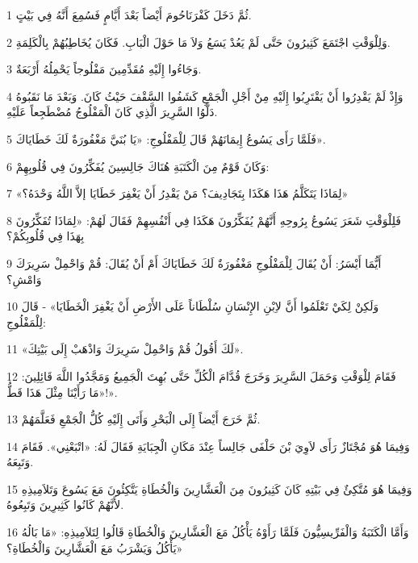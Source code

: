 \par 1 ثُمَّ دَخَلَ كَفْرَنَاحُومَ أَيْضاً بَعْدَ أَيَّامٍ فَسُمِعَ أَنَّهُ فِي بَيْتٍ.
\par 2 وَلِلْوَقْتِ اجْتَمَعَ كَثِيرُونَ حَتَّى لَمْ يَعُدْ يَسَعُ وَلاَ مَا حَوْلَ الْبَابِ. فَكَانَ يُخَاطِبُهُمْ بِالْكَلِمَةِ.
\par 3 وَجَاءُوا إِلَيْهِ مُقَدِّمِينَ مَفْلُوجاً يَحْمِلُهُ أَرْبَعَةٌ.
\par 4 وَإِذْ لَمْ يَقْدِرُوا أَنْ يَقْتَرِبُوا إِلَيْهِ مِنْ أَجْلِ الْجَمْعِ كَشَفُوا السَّقْفَ حَيْثُ كَانَ. وَبَعْدَ مَا نَقَبُوهُ دَلَّوُا السَّرِيرَ الَّذِي كَانَ الْمَفْلُوجُ مُضْطَجِعاً عَلَيْهِ.
\par 5 فَلَمَّا رَأَى يَسُوعُ إِيمَانَهُمْ قَالَ لِلْمَفْلُوجِ: «يَا بُنَيَّ مَغْفُورَةٌ لَكَ خَطَايَاكَ».
\par 6 وَكَانَ قَوْمٌ مِنَ الْكَتَبَةِ هُنَاكَ جَالِسِينَ يُفَكِّرُونَ فِي قُلُوبِهِمْ:
\par 7 «لِمَاذَا يَتَكَلَّمُ هَذَا هَكَذَا بِتَجَادِيفَ؟ مَنْ يَقْدِرُ أَنْ يَغْفِرَ خَطَايَا إلاَّ اللَّهُ وَحْدَهُ؟»
\par 8 فَلِلْوَقْتِ شَعَرَ يَسُوعُ بِرُوحِهِ أَنَّهُمْ يُفَكِّرُونَ هَكَذَا فِي أَنْفُسِهِمْ فَقَالَ لَهُمْ: «لِمَاذَا تُفَكِّرُونَ بِهَذَا فِي قُلُوبِكُمْ؟
\par 9 أَيُّمَا أَيْسَرُ: أَنْ يُقَالَ لِلْمَفْلُوجِ مَغْفُورَةٌ لَكَ خَطَايَاكَ أَمْ أَنْ يُقَالَ: قُمْ وَاحْمِلْ سَرِيرَكَ وَامْشِ؟
\par 10 وَلَكِنْ لِكَيْ تَعْلَمُوا أَنَّ لاِبْنِ الإِنْسَانِ سُلْطَاناً عَلَى الأَرْضِ أَنْ يَغْفِرَ الْخَطَايَا» - قَالَ لِلْمَفْلُوجِ:
\par 11 «لَكَ أَقُولُ قُمْ وَاحْمِلْ سَرِيرَكَ وَاذْهَبْ إِلَى بَيْتِكَ».
\par 12 فَقَامَ لِلْوَقْتِ وَحَمَلَ السَّرِيرَ وَخَرَجَ قُدَّامَ الْكُلِّ حَتَّى بُهِتَ الْجَمِيعُ وَمَجَّدُوا اللَّهَ قَائِلِينَ: «مَا رَأَيْنَا مِثْلَ هَذَا قَطُّ!».
\par 13 ثُمَّ خَرَجَ أَيْضاً إِلَى الْبَحْرِ وَأَتَى إِلَيْهِ كُلُّ الْجَمْعِ فَعَلَّمَهُمْ.
\par 14 وَفِيمَا هُوَ مُجْتَازٌ رَأَى لاَوِيَ بْنَ حَلْفَى جَالِساً عِنْدَ مَكَانِ الْجِبَايَةِ فَقَالَ لَهُ: «اتْبَعْنِي». فَقَامَ وَتَبِعَهُ.
\par 15 وَفِيمَا هُوَ مُتَّكِئٌ فِي بَيْتِهِ كَانَ كَثِيرُونَ مِنَ الْعَشَّارِينَ وَالْخُطَاةِ يَتَّكِئُونَ مَعَ يَسُوعَ وَتَلاَمِيذِهِ لأَنَّهُمْ كَانُوا كَثِيرِينَ وَتَبِعُوهُ.
\par 16 وَأَمَّا الْكَتَبَةُ وَالْفَرِّيسِيُّونَ فَلَمَّا رَأَوْهُ يَأْكُلُ مَعَ الْعَشَّارِينَ وَالْخُطَاةِ قَالُوا لِتَلاَمِيذِهِ: «مَا بَالُهُ يَأْكُلُ وَيَشْرَبُ مَعَ الْعَشَّارِينَ وَالْخُطَاةِ؟»
